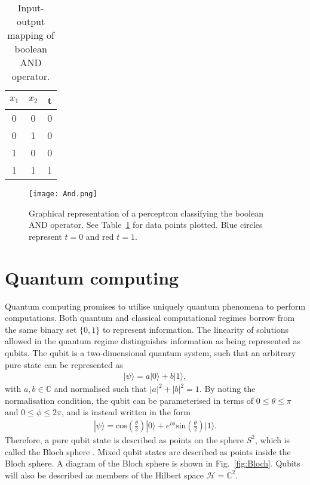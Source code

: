 \documentclass[twocolumn,superscriptaddress]{revtex4-1}
\begin{document}
\begin{table}
\caption{\label{tab:and} Input-output mapping of boolean AND operator.}
\begin{ruledtabular}
\begin{tabular}{|c|c|c|}
\hline
$x_1$ & $x_2$ & t \\ \hline
0 & 0 & 0 \\ \hline
0 & 1 & 0 \\ \hline
1 & 0 & 0 \\ \hline
1 & 1 & 1 \\ \hline
\end{tabular}
\end{ruledtabular}
\end{table}

\begin{figure}[t!]
\texttt{[image: And.png]}
\caption{Graphical representation of a perceptron classifying the boolean AND operator. See Table~\ref{tab:and} for data points plotted. Blue circles represent $t=0$ and red $t=1$.}
\label{fig:And}
\end{figure}

\section{Quantum computing} \label{computing}

Quantum computing promises to utilise uniquely quantum phenomena to perform computations. Both quantum and classical computational regimes borrow from the same binary set $\{0, 1 \}$ to represent information. The linearity of solutions allowed in the quantum regime distinguishes information as being represented as qubits. The qubit is a two-dimensional quantum system, such that an arbitrary pure state can be represented as
\begin{equation} \label{eq:qubit1}
\begin{split}
|\psi \rangle = a |0 \rangle + b |1 \rangle,
\end{split}
\end{equation}
with $a, b \in \mathbb{C}$ and normalised such that $|a|^2 + |b|^2 = 1$. By noting the normalisation condition, the qubit can be parameterised in terms of $0 \leq \theta \leq \pi$ and $0 \leq \phi \leq 2\pi$, and is instead written in the form
\begin{equation} \label{eq:qubit2}
\begin{split}
|\psi \rangle = \text{cos}\left(\frac{\theta}{2}\right) |0 \rangle + e^{i \phi} \text{sin}\left(\frac{\theta}{2}\right)|1 \rangle.
\end{split}
\end{equation}
Therefore, a pure qubit state is described as points on the sphere $S^2$, which is called the Bloch sphere \cite{Inaki2024}. Mixed qubit states are described as points inside the Bloch sphere. A diagram of the Bloch sphere is shown in Fig.~\ref{fig:Bloch}. Qubits will also be described as members of the Hilbert space $\mathcal{H} = \mathbb{C}^2$. 
\end{document}
